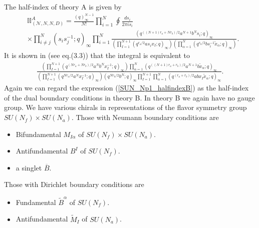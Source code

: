 \documentclass[12pt]{article}
\numberwithin{equation}{section}
\begin{document}
The half-index of theory A is given by
\begin{align}
\label{SUN_Np1_halfindex}
&\mathbb{II}^A_{(\mathcal{N},N,N,D)}
=\frac{(q)_{\infty}^{N-1}}{N!} \prod_{i=1}^N \oint \frac{ds_i}{2\pi i s_i}
\nonumber\\
&\times 
\prod_{i \ne j}^N (s_i s_j^{-1}; q)_{\infty}
\prod_{i = 1}^N 
\frac{(q^{((N+1)r_a + Nr_b)/2} a^{N+1} b^N s_i; q)_{\infty}}{\left( \prod_{I = 1}^{N+1} (q^{r_a/2} a s_i x_{I}; q)_{\infty} \right) \left( \prod_{\alpha = 1}^N (q^{r_b/2} b s_i^{-1} \tilde{x}_{\alpha}; q)_{\infty} \right)}. 
\end{align}
It is shown in \cite{MR1266569} (see eq.(3.3)) that the integral is equivalent to
\begin{align}
\label{SUN_Np1_halfindexB}
\frac{\left( \prod_{I = 1}^{N+1} \left( q^{(Nr_a + Nr_b)/2} a^N b^N x_I^{-1}; q \right)_{\infty} \right) \prod_{\alpha = 1}^N (q^{((N+1)r_a + r_b)/2} a^{N+1} b \tilde{x}_{\alpha}; q)_{\infty}}{\left( \prod_{I = 1}^{N+1} \left( q^{Nr_a/2} a^N x_I^{-1}; q \right)_{\infty} \right) \left( q^{Nr_b/2} b^N; q \right)_{\infty} \prod_{I = 1}^{N+1} \prod_{\alpha = 1}^{N} (q^{(r_a + r_b)/2} ab x_I \tilde{x}_{\alpha}; q)_{\infty}}. 
\end{align}
Again we can regard the expression (\ref{SUN_Np1_halfindexB}) as the half-index of the dual boundary conditions in theory B. 
In theory B we again have no gauge group. We have various chirals in representations of
the flavor symmetry group $SU(N_f) \times SU(N_a)$. Those with
Neumann boundary conditions are
\begin{itemize}
\item Bifundamental $M_{I\alpha}$ of $SU(N_f) \times SU(N_a)$.
\item Antifundamental $B^I$ of $SU(N_f)$.
\item a singlet $\overline{B}$.
\end{itemize}
Those with Dirichlet boundary conditions are
\begin{itemize}
\item Fundamental $\widetilde{B}^{\alpha}$ of $SU(N_f)$.
\item Antifundamental $\widetilde{M}_I$ of $SU(N_a)$.
\end{itemize}
\end{document}
